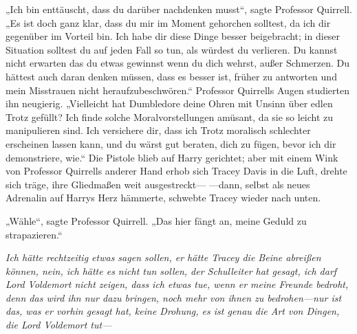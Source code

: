 „Ich bin enttäuscht, dass du darüber nachdenken musst“, sagte Professor Quirrell.
„Es ist doch ganz klar, dass du mir im Moment gehorchen solltest, da ich dir gegenüber im Vorteil bin. Ich habe dir diese Dinge besser beigebracht; in dieser Situation solltest du auf jeden Fall so tun, als würdest du verlieren. Du kannst nicht erwarten das du etwas gewinnst wenn du dich wehrst, außer Schmerzen. Du hättest auch daran denken müssen, dass es besser ist, früher zu antworten und mein Misstrauen nicht heraufzubeschwören.“
Professor Quirrells Augen studierten ihn neugierig.
„Vielleicht hat Dumbledore deine Ohren mit Unsinn über edlen Trotz gefüllt? Ich finde solche Moralvorstellungen amüsant, da sie so leicht zu manipulieren sind. Ich versichere dir, dass ich Trotz moralisch schlechter erscheinen lassen kann, und du wärst gut beraten, dich zu fügen, bevor ich dir demonstriere, wie.“
Die Pistole blieb auf Harry gerichtet; aber mit einem Wink von Professor Quirrells anderer Hand erhob sich Tracey Davis in die Luft, drehte sich träge, ihre Gliedmaßen weit ausgestreckt—
—dann, selbst als neues Adrenalin auf Harrys Herz hämmerte, schwebte Tracey wieder nach unten.

„Wähle“, sagte Professor Quirrell. „Das hier fängt an, meine Geduld zu strapazieren.“

\emph{Ich hätte rechtzeitig etwas sagen sollen, er hätte Tracey die Beine abreißen können, nein, ich hätte es nicht tun sollen, der Schulleiter hat gesagt, ich darf Lord Voldemort nicht zeigen, dass ich etwas tue, wenn er meine Freunde bedroht, denn das wird ihn nur dazu bringen, noch mehr von ihnen zu bedrohen—nur ist das, was er vorhin gesagt hat, keine \emph{Drohung}, es ist genau die Art von Dingen, die Lord Voldemort \emph{tut}—}

